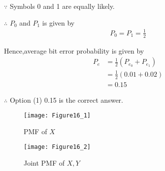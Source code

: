 \documentclass[journal,12pt,twocolumn]{IEEEtran}
\begin{document}
$\because$ Symbols 0 and 1 are equally likely.

$\therefore$ $P_0$ and $P_1$ is given by
\begin{align}
    P_0=P_1=\frac{1}{2}
\end{align}

Hence,average bit error probability is given by
\begin{align}
    P_e &=\frac{1}{2}(P_{e_{0}}+P_{e_{1}}) \\
    &= \frac{1}{2}(0.01+0.02) \\
    &= \boxed{0.15}
\end{align}

$\therefore$ Option (1) 0.15 is the correct answer.

\begin{figure}[!ht]
\centering
\texttt{[image: Figure16\_1]}
\caption{PMF of $X$}
\label{fig:pmf_x}	
\end{figure}

\begin{figure}[!ht]
\centering
\texttt{[image: Figure16\_2]}
\caption{Joint PMF of $X,Y$}
\label{fig:joint_pmf}	
\end{figure}
\end{document}
